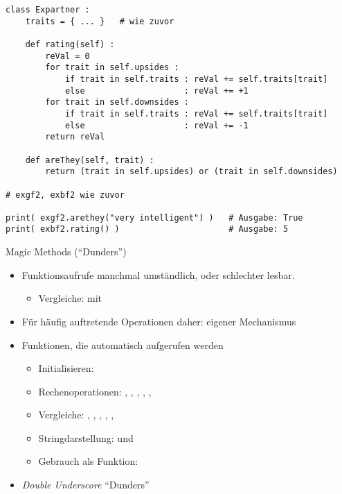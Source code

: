 \begin{frame}[fragile]
%
\begin{codebox}
\begin{verbatim}
class Expartner :
    traits = { ... }   # wie zuvor
    
    def rating(self) :
        reVal = 0
        for trait in self.upsides :
            if trait in self.traits : reVal += self.traits[trait]
            else                    : reVal += +1
        for trait in self.downsides :
            if trait in self.traits : reVal += self.traits[trait]
            else                    : reVal += -1
        return reVal
   
    def areThey(self, trait) :
        return (trait in self.upsides) or (trait in self.downsides)

# exgf2, exbf2 wie zuvor

print( exgf2.arethey("very intelligent") )   # Ausgabe: True
print( exbf2.rating() )                      # Ausgabe: 5
\end{verbatim}
\end{codebox}
%
\end{frame}



\begin{frame}{Magic Methods (\enquote{Dunders})}
%
\begin{itemize}
\item Funktionsaufrufe manchmal umständlich, oder schlechter lesbar.
	\begin{itemize}
	\item Vergleiche:  mit 
	\end{itemize}
\item Für häufig auftretende Operationen daher: eigener Mechanismus
\item Funktionen, die automatisch aufgerufen werden
	\begin{itemize}
	\item Initialisieren: 
	\item Rechenoperationen: , , , , , 
	\item Vergleiche: , , , , , 
	\item Stringdarstellung:  und 
	\item Gebrauch als Funktion: 
	\end{itemize}
\item \emph{Double Underscore} \Thus \enquote{Dunders}
\end{itemize}
%
\end{frame}

